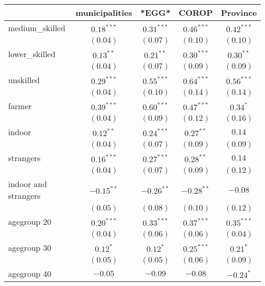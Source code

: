 
\begin{table}
\begin{center}
\begin{tabular}{l c c c c}
\hline
 & municipalities & *EGG* & COROP & Province \\
\hline
medium\_skilled      & $0.18^{***}$  & $0.31^{***}$  & $0.46^{***}$  & $0.42^{***}$  \\
                     & $(0.04)$      & $(0.07)$      & $(0.10)$      & $(0.10)$      \\
lower\_skilled       & $0.13^{**}$   & $0.21^{**}$   & $0.30^{***}$  & $0.30^{**}$   \\
                     & $(0.04)$      & $(0.07)$      & $(0.09)$      & $(0.09)$      \\
unskilled            & $0.29^{***}$  & $0.55^{***}$  & $0.64^{***}$  & $0.56^{***}$  \\
                     & $(0.04)$      & $(0.10)$      & $(0.14)$      & $(0.14)$      \\
farmer               & $0.39^{***}$  & $0.60^{***}$  & $0.47^{***}$  & $0.34^{*}$    \\
                     & $(0.04)$      & $(0.09)$      & $(0.12)$      & $(0.16)$      \\
indoor               & $0.12^{**}$   & $0.24^{***}$  & $0.27^{**}$   & $0.14$        \\
                     & $(0.04)$      & $(0.07)$      & $(0.09)$      & $(0.09)$      \\
strangers            & $0.16^{***}$  & $0.27^{***}$  & $0.28^{**}$   & $0.14$        \\
                     & $(0.04)$      & $(0.07)$      & $(0.09)$      & $(0.12)$      \\
indoor and strangers & $-0.15^{**}$  & $-0.26^{**}$  & $-0.28^{**}$  & $-0.08$       \\
                     & $(0.05)$      & $(0.08)$      & $(0.10)$      & $(0.12)$      \\
agegroup 20          & $0.20^{***}$  & $0.33^{***}$  & $0.37^{***}$  & $0.35^{***}$  \\
                     & $(0.04)$      & $(0.06)$      & $(0.06)$      & $(0.04)$      \\
agegroup 30          & $0.12^{*}$    & $0.12^{*}$    & $0.25^{***}$  & $0.21^{*}$    \\
                     & $(0.05)$      & $(0.05)$      & $(0.06)$      & $(0.09)$      \\
agegroup 40          & $-0.05$       & $-0.09$       & $-0.08$       & $-0.24^{*}$   \\

\end{tabular}
\end{center}
\end{table}
